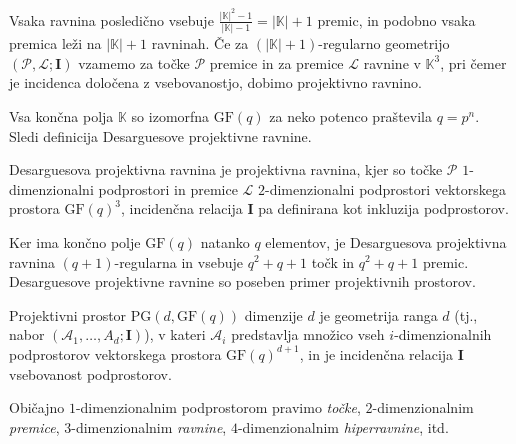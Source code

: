 \documentclass[fin1, tisk]{fmfdelo}
\newcommand{\A}{\mathcal{A}}
\newcommand{\II}{\mathbf{I}}
\newcommand{\PP}{\mathcal{P}}
\newcommand{\LL}{\mathcal{L}}
\newcommand{\PG}{\mathrm{PG}}
\newcommand{\GF}{\mathrm{GF}}
\begin{document}
Vsaka ravnina posledično vsebuje $\frac{|\mathbb{K}|^2-1}{|\mathbb{K}|-1} = |\mathbb{K}| + 1$ premic, in podobno
vsaka premica leži na $|\mathbb{K}| + 1$ ravninah. Če za $(|\mathbb{K}| +1)$-regularno geometrijo $(\PP, \LL; \II)$ vzamemo 
za točke $\PP$ premice in za premice $\LL$ ravnine v $\mathbb{K}^3$, pri čemer je incidenca določena z vsebovanostjo, dobimo projektivno ravnino.

Vsa končna polja $\mathbb{K}$ so izomorfna $\GF(q)$ za neko potenco praštevila $q = p^n$. Sledi definicija Desarguesove projektivne ravnine.

\begin{trditev}
    Desarguesova projektivna ravnina je projektivna ravnina, kjer so točke $\PP$ 
    $1$-dimenzionalni podprostori in premice $\LL$ $2$-dimenzionalni podprostori vektorskega prostora $\GF(q)^3$,
    incidenčna relacija $\II$ pa definirana kot inkluzija podprostorov.
\end{trditev}

\begin{opomba}
    Ker ima končno polje $\GF(q)$ natanko $q$ elementov, je Desarguesova projektivna ravnina 
    $(q+1)$-regularna in vsebuje $q^2 + q + 1$ točk in $q^2 + q + 1$ premic.
    Desarguesove projektivne ravnine so poseben primer projektivnih prostorov.
\end{opomba}

\begin{definicija}\label{def:projektivni_prostor}
    Projektivni prostor $\PG(d, \GF(q))$ dimenzije $d$ je geometrija ranga $d$ (tj., nabor $(\A_1, \ldots,A_d; \II)$),
    v kateri $\A_i$ predstavlja množico vseh $i$-dimenzionalnih 
    podprostorov vektorskega prostora $\GF(q)^{d+1}$, in je incidenčna relacija $\II$ vsebovanost podprostorov.
    
    Običajno $1$-dimenzionalnim podprostorom pravimo \emph{točke}, $2$-dimenzionalnim \emph{premice}, 
    $3$-dimenzionalnim \emph{ravnine}, $4$-dimenzionalnim \emph{hiperravnine}, 
    itd. 
\end{definicija}
\end{document}

